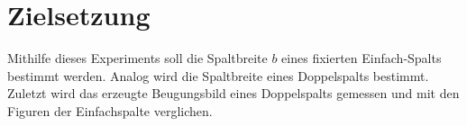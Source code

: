 \section{Zielsetzung}
\label{sec:Zielsetzung}

Mithilfe dieses Experiments soll die Spaltbreite $b$ eines fixierten 
Einfach-Spalts bestimmt werden. Analog wird die Spaltbreite eines Doppelspalts 
bestimmt. Zuletzt wird das erzeugte Beugungsbild eines Doppelspalts gemessen
und mit den Figuren der Einfachspalte verglichen.